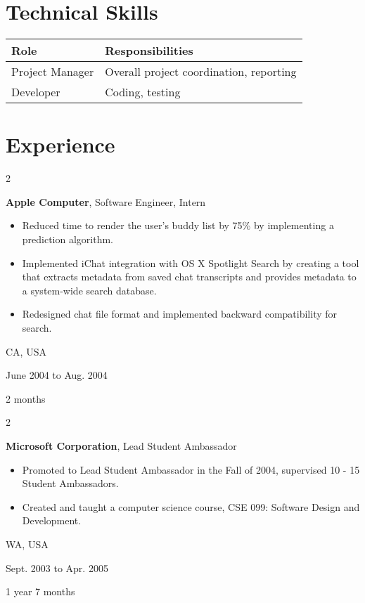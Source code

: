 \documentclass[10pt, letterpaper]{article}
\newenvironment{highlights}{
	\begin{itemize}[
		topsep=0.10 cm,
		parsep=0.10 cm,
		partopsep=0pt,
		itemsep=0pt,
		leftmargin=0.4 cm + 10pt
		]
	}{
	\end{itemize}
} %
\newenvironment{twocolentry}[2][]{
	\onecolentry
	\def\secondColumn{#2}
	\setcolumnwidth{\fill, 4.5 cm}
	\begin{paracol}{2}
	}{
		\switchcolumn \raggedleft \secondColumn
	\end{paracol}
	\endonecolentry
} %
\begin{document}
	\section{Technical Skills}
	
	\begin{tabularx}{\textwidth}{lX} 
	    \toprule
	    Role & Responsibilities \\ 
	    \midrule
	    Project Manager &  Overall project coordination, reporting  \\
	    Developer & Coding, testing  \\
	    \bottomrule
	\end{tabularx}
	
	
	\pagebreak
	
	\section{Experience}
	
	
	\begin{twocolentry}{
			CA, USA
			
			June 2004 to Aug. 2004
			
			2 months
		}
		\textbf{Apple Computer}, Software Engineer, Intern
		\begin{highlights}
			\item Reduced time to render the user's buddy list by 75\% by implementing a prediction algorithm.
			\item Implemented iChat integration with OS X Spotlight Search by creating a tool that extracts metadata from saved chat transcripts and provides metadata to a system-wide search database.
			\item Redesigned chat file format and implemented backward compatibility for search.
		\end{highlights}
	\end{twocolentry}
	
	
	\vspace{0.2 cm}
	
	\begin{twocolentry}{
			WA, USA
			
			Sept. 2003 to Apr. 2005
			
			1 year 7 months
		}
		\textbf{Microsoft Corporation}, Lead Student Ambassador
		\begin{highlights}
			\item Promoted to Lead Student Ambassador in the Fall of 2004, supervised 10 - 15 Student Ambassadors.
			\item Created and taught a computer science course, CSE 099: Software Design and Development.
		\end{highlights}
	\end{twocolentry}
	
\end{document}
